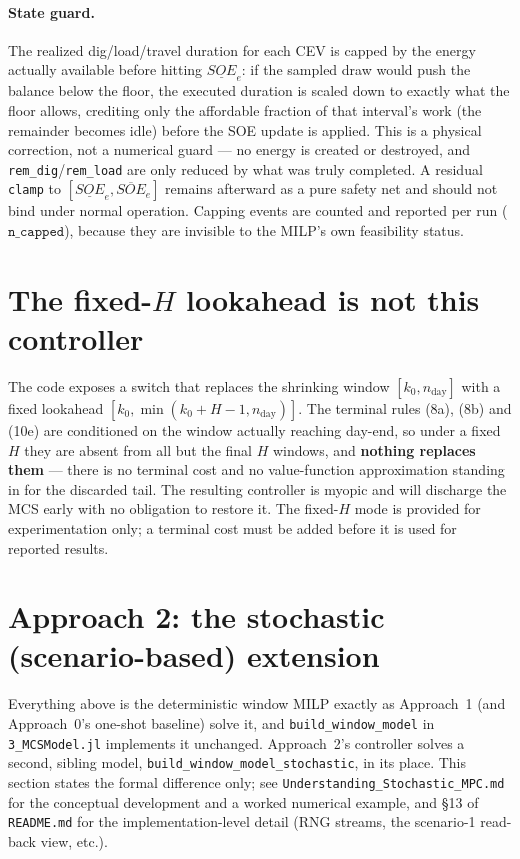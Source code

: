 \documentclass[11pt]{article}
\begin{document}
\paragraph{State guard.} The realized dig/load/travel duration for each CEV is capped by the
energy actually available before hitting $\underline{SOE}_e$: if the sampled draw would push the
balance below the floor, the executed duration is scaled down to exactly what the floor allows,
crediting only the affordable fraction of that interval's work (the remainder becomes idle) before
the SOE update is applied. This is a physical correction, not a numerical guard — no energy is
created or destroyed, and \texttt{rem\_dig}/\texttt{rem\_load} are only reduced by what was truly
completed. A residual \texttt{clamp} to $[\underline{SOE}_e,\overline{SOE}_e]$ remains afterward as
a pure safety net and should not bind under normal operation. Capping events are counted and
reported per run ($\texttt{n\_capped}$), because they are invisible to the MILP's own feasibility
status.

\section{The fixed-\texorpdfstring{$H$}{H} lookahead is not this controller}
\label{sec:fixedH}
The code exposes a switch that replaces the shrinking window $[k_0,n_{\text{day}}]$ with a fixed
lookahead $[k_0,\min(k_0+H-1,n_{\text{day}})]$. The terminal rules (8a), (8b) and (10e) are conditioned on the window actually reaching
day-end, so under a fixed $H$ they are absent from all but the final $H$ windows, and
\textbf{nothing replaces them} --- there is no terminal cost and no value-function approximation
standing in for the discarded tail. The resulting controller is myopic and will discharge the MCS
early with no obligation to restore it. The fixed-$H$ mode is provided for experimentation only;
a terminal cost must be added before it is used for reported results.

\section{Approach 2: the stochastic (scenario-based) extension}
\label{sec:stochastic}
Everything above is the deterministic window MILP exactly as Approach~1 (and Approach~0's
one-shot baseline) solve it, and \texttt{build\_window\_model} in \texttt{3\_MCSModel.jl}
implements it unchanged. Approach~2's controller solves a second, sibling model,
\texttt{build\_window\_model\_stochastic}, in its place. This section states the formal
difference only; see \texttt{Understanding\_Stochastic\_MPC.md} for the conceptual
development and a worked numerical example, and \S13 of \texttt{README.md} for the
implementation-level detail (RNG streams, the scenario-1 read-back view, etc.).
\end{document}
